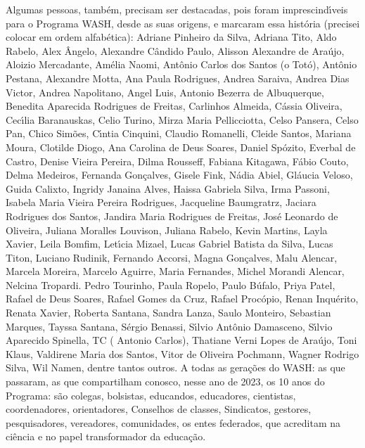 \begin{agradecimentos}
Algumas pessoas, tamb\'em, precisam ser destacadas, pois foram imprescind\'{\i}veis para o Programa WASH, desde as suas origens, e marcaram essa hist\'oria (precisei colocar em ordem alfab\'etica): Adriane Pinheiro da Silva, Adriana Tito, Aldo Rabelo, Alex \^Angelo, Alexandre C\^andido Paulo, Alisson Alexandre de Ara\'ujo, Aloizio Mercadante, Am\'elia Naomi, Ant\^onio Carlos dos Santos (o Tot\'o), Ant\^onio Pestana, Alexandre Motta, Ana Paula Rodrigues, Andrea Saraiva, Andrea Dias Victor, Andrea Napolitano, Angel Luis, Antonio Bezerra de Albuquerque, Benedita Aparecida Rodrigues de Freitas, Carlinhos Almeida, C\'assia Oliveira, Cec\'{\i}lia Baranauskas, Celio Turino, Mirza Maria Pellicciotta, Celso Pansera, Celso Pan, Chico Sim\~oes, C\'{\i}ntia Cinquini, Claudio Romanelli, Cleide Santos, Mariana Moura, Clotilde Diogo, Ana Carolina de Deus Soares, Daniel Sp\'ozito, Everbal de Castro, Denise  Vieira Pereira, Dilma Rousseff,  Fabiana Kitagawa, F\'abio Couto, Delma  Medeiros, Fernanda Gon\c{c}alves, Gisele Fink, N\'adia Abiel, Gl\'aucia Veloso, Guida Calixto,  Ingridy Janaina Alves, Haissa Gabriela Silva, Irma Passoni, Isabela Maria Vieira Pereira Rodrigues, Jacqueline Baumgratrz, Jaciara Rodrigues dos Santos, Jandira Maria Rodrigues de Freitas, Jos\'e Leonardo de Oliveira, Juliana Moralles Louvison, Juliana Rabelo, Kevin Martins, Layla Xavier, Leila Bomfim, Let\'{\i}cia Mizael, Lucas Gabriel Batista da Silva, Lucas Titon, Luciano Rudinik, Fernando Accorsi, Magna Gon\c{c}alves, Malu Alencar, Marcela Moreira, Marcelo Aguirre, Maria Fernandes, Michel Morandi Alencar, Nelcina Tropardi. Pedro Tourinho, Paula Ropelo, Paulo B\'ufalo, Priya Patel, Rafael de Deus Soares, Rafael Gomes da Cruz, Rafael Proc\'opio, Renan Inqu\'erito, Renata Xavier, Roberta Santana,  Sandra Lanza, Saulo Monteiro, Sebastian Marques, Tayssa Santana,  S\'ergio Benassi, S\'{\i}lvio Ant\^onio Damasceno, S\'{\i}lvio Aparecido Spinella, TC ( Antonio Carlos), Thatiane Verni Lopes de Ara\'ujo, Toni Klaus, Valdirene Maria dos Santos, Vitor de Oliveira Pochmann, Wagner Rodrigo Silva, Wil Namen, dentre tantos outros.
A todas as gera\c{c}\~oes do WASH: as que passaram, as que compartilham conosco, nesse ano de 2023, os 10 anos do Programa: s\~ao colegas, bolsistas, educandos, educadores, cientistas, coordenadores, orientadores, Conselhos de classes, Sindicatos, gestores, pesquisadores, vereadores, comunidades, os entes federados, que acreditam na ci\^encia e no papel transformador da educa\c{c}\~ao.

\end{agradecimentos}
